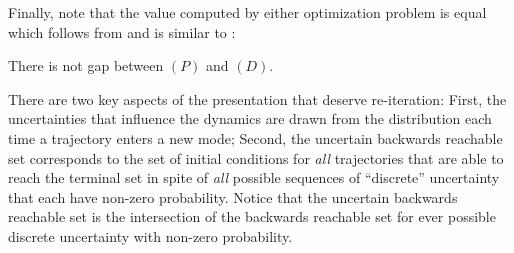 Finally, note that the value computed by either optimization problem is equal which follows from \cite[Theorem 3.10]{Anderson1987} and is similar to \cite[Theorem 2]{henrion2014convex}:
\begin{lemma}
There is not gap between $(P)$ and $(D)$.
\end{lemma}

\begin{remark}
There are two key aspects of the presentation that deserve re-iteration: 
First, the uncertainties that influence the dynamics are drawn from the distribution each time a trajectory enters a new mode; 
Second, the uncertain backwards reachable set corresponds to the set of initial conditions for \emph{all} trajectories that are able to reach the terminal set in spite of \emph{all} possible sequences of ``discrete'' uncertainty that each have non-zero probability.
Notice that the uncertain backwards reachable set is the intersection of the backwards reachable set for ever possible discrete uncertainty with non-zero probability.
\end{remark}
